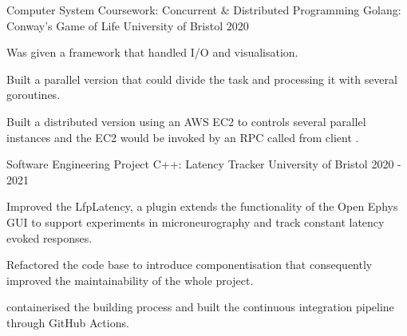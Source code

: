 

\begin{cventries}

  \cventry
    {Computer System Coursework: Concurrent \& Distributed Programming} %
    {Golang: Conway's Game of Life} %
    {University of Bristol} %
    {2020} %
    {
      \begin{cvitems} %
        \item {Was given a framework that handled I/O and visualisation.}
        \item {Built a parallel version that could divide the task and processing it with several goroutines.}
        \item {Built a distributed version using an AWS EC2 to controls several parallel instances and the EC2 would be invoked by an RPC called from client .}
      \end{cvitems}
    }

  \cventry
    {Software Engineering Project} %
    {C++: Latency Tracker} %
    {University of Bristol} %
    {2020 - 2021} %
    {
      \begin{cvitems} %
        \item {Improved the LfpLatency, a plugin extends the functionality of the Open Ephys GUI to support experiments in microneurography and track constant latency evoked responses.}
        \item {Refactored the code base to introduce componentisation that consequently improved the maintainability of the whole project.}
        \item {containerised the building process and built the continuous integration pipeline through GitHub Actions.}
      \end{cvitems}
    }


\end{cventries}
